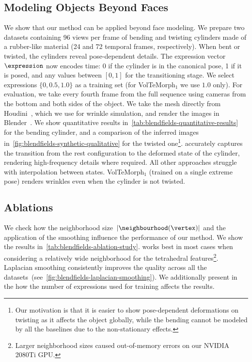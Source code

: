   \subsection{Modeling Objects Beyond Faces}
    We show that our method can be applied beyond face modeling.
    We prepare two datasets containing 96 views per frame of bending and
    twisting cylinders made of a rubber-like material (24 and 72 temporal
    frames, respectively).
    When bent or twisted, the cylinders reveal pose-dependent details.
    The expression vector $\expression$ now encodes time: 0 if the cylinder is
    in the canonical pose, 1 if it is posed, and any values between $[0, 1]$
    for the transitioning stage.
    We select expressions $\{0, 0.5, 1.0\}$ as a training set (for
    VolTeMorph$_1$ we use $1.0$ only).
    For evaluation, we take every fourth frame from the full sequence using
    cameras from the bottom and both sides of the object.
    We take the mesh directly from Houdini~\cite{xu2014houdini}, which we use
    for wrinkle simulation, and render the images in
    Blender~\cite{blender2022}.
    We show quantitative results
    in~\cref{tab:blendfields-quantitative-results} for the bending cylinder,
    and a comparison of the inferred images
    in~\cref{fig:blendfields-synthetic-qualitative} for the twisted
    one\footnote{Our motivation is that it is easier to show pose-dependent
    deformations on twisting as it affects the object globally, while the
    bending cannot be modeled by all the baselines due to the non-stationary
    effects.
    }. \blendfields accurately captures the transition from the rest configuration to the deformed state of the cylinder, rendering high-frequency details where required.
    All other approaches struggle with interpolation between states.
    VolTeMorph$_1$ (trained on a single extreme pose) renders wrinkles even
    when the cylinder is not twisted.

  \subsection{Ablations}
    We check how the neighborhood size~$|\neighbourhood(\vertex)|$ and the
    application of the smoothing influence the performance of our method.
    We show the results in~\cref{tab:blendfields-ablation-study}.
    \blendfields works best in most cases when considering a relatively wide neighborhood for the tetrahedral features\footnote{Larger neighborhood sizes caused out-of-memory errors on our NVIDIA 2080Ti GPU.}.
    Laplacian smoothing consistently improves the quality across all the
    datasets~(see~\cref{fig:blendfields-laplacian-smoothing}).
    We additionally present in the \supplementary{} how the number of
    expressions used for training affects the results.

